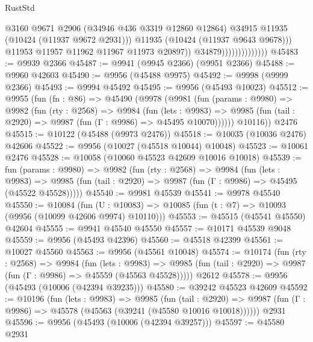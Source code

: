 \begin{lexlean}{RustStd}
\begin{coremodule}
                                        @3160
                                        @9671
                                        @2906
                                        (@34946 @436 @3319 @12860 @12864)
                                        @34915
                                        @11935
                                        (@10424 (@11937 @9672 @2931)))
                                      @11935
                                      (@10424 (@11937 @9643 @9678)))
                                    @11953
                                    @11957
                                    @11962
                                    @11967
                                    @11973
                                    @20897))
                                @34879))))))))))))))
@45483 := @9939 @2366
@45487 := @9941 (@9945 @2366) (@9951 @2366)
@45488 := @9960 @42603
@45490 := @9956 (@45488 @9975)
@45492 := @9998 (@9999 @2366)
@45493 := @9994 @45492
@45495 := @9956 (@45493 @10023)
@45512 := @9955
    (fun (fn : @86) =>
    @45490
      (@9978
        (@9981
          (fun (params : @9980) =>
          @9982
            (fun (rty : @2568) =>
            @9984
              (fun (lets : @9983) =>
              @9985 (fun (tail : @2920) => @9987 (fun (Γ : @9986) => @45495 @10070))))))
        @10116))
    @2476
@45515 := @10122 (@45488 (@9973 @2476))
@45518 := @10035 (@10036 @2476) @42606
@45522 := @9956 (@10027 (@45518 @10044) @10048)
@45523 := @10061 @2476
@45528 := @10058 (@10060 @45523 @42609 @10016 @10018)
@45539 := fun (params : @9980) =>
  @9982
    (fun (rty : @2568) =>
    @9984
      (fun (lets : @9983) =>
      @9985 (fun (tail : @2920) => @9987 (fun (Γ : @9986) => @45495 (@45522 @45528)))))
@45540 := @9981 @45539
@45541 := @9978 @45540
@45550 := @10084
    (fun (U : @10083) => @10085 (fun (t : @7) => @10093 (@9956 (@10099 @42606 @9974) @10110)))
@45553 := @45515 (@45541 @45550) @42604
@45555 := @9941 @45540 @45550
@45557 := @10171 @45539 @9048
@45559 := @9956 (@45493 @42396)
@45560 := @45518 @42399
@45561 := @10027 @45560
@45563 := @9956 (@45561 @10048)
@45574 := @10174
    (fun (rty : @2568) =>
    @9984
      (fun (lets : @9983) =>
      @9985 (fun (tail : @2920) => @9987 (fun (Γ : @9986) => @45559 (@45563 @45528)))))
    @2612
@45578 := @9956 (@45493 (@10006 (@42394 @39235)))
@45580 := @39242 @45523 @42609
@45592 := @10196
    (fun (lets : @9983) =>
    @9985
      (fun (tail : @2920) =>
      @9987 (fun (Γ : @9986) => @45578 (@45563 (@39241 (@45580 @10016 @10018))))))
    @2931
@45596 := @9956 (@45493 (@10006 (@42394 @39257)))
@45597 := @45580 @2931

\end{coremodule}
\end{lexlean}
